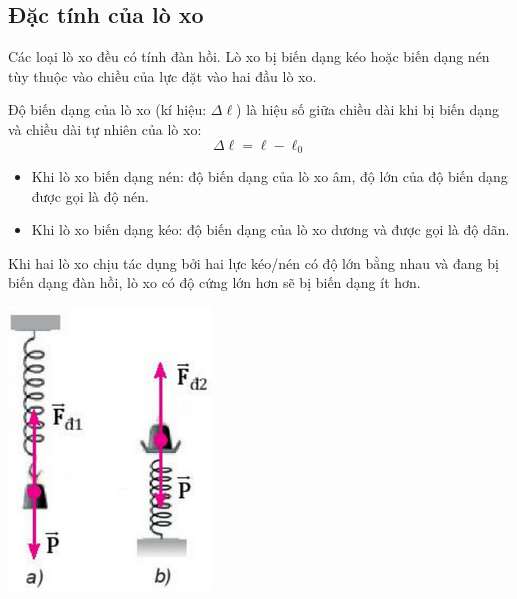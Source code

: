 \subsection{Đặc tính của lò xo}
Các loại lò xo đều có tính đàn hồi. Lò xo bị biến dạng kéo hoặc biến dạng nén tùy thuộc vào chiều của lực đặt vào hai đầu lò xo.\\
\begin{minipage}{0.6\textwidth}
	Độ biến dạng của lò xo (kí hiệu: $\Delta \ell$) là hiệu số giữa chiều dài khi bị biến dạng và chiều dài tự nhiên của lò xo:
	$$\Delta \ell=\ell-\ell_0$$
	\begin{itemize}
		\item Khi lò xo biến dạng nén: độ biến dạng của lò xo âm, độ lớn của độ biến dạng được gọi là độ nén.
		\item Khi lò xo biến dạng kéo: độ biến dạng của lò xo dương và được gọi là độ dãn.
	\end{itemize}
	
	
	Khi hai lò xo chịu tác dụng bởi hai lực kéo/nén có độ lớn bằng nhau và đang bị biến dạng đàn hồi, lò xo có độ cứng lớn hơn sẽ bị biến dạng ít hơn.
\end{minipage}
\begin{minipage}{0.4\textwidth}
	\begin{center}
		\includegraphics[scale=0.8]{../figs/G10-028-2}
	\end{center}
\end{minipage}

